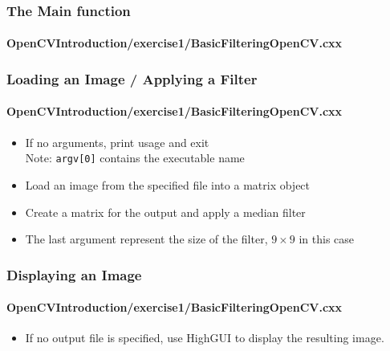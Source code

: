 \begin{frame}
\frametitle{The Main function}
\framesubtitle{OpenCVIntroduction/exercise1/BasicFilteringOpenCV.cxx}
\begin{center}
\begin{itemize}
\end{itemize}
\end{center}
\end{frame}


\begin{frame}
\frametitle{Loading an Image / Applying a Filter}
\framesubtitle{OpenCVIntroduction/exercise1/BasicFilteringOpenCV.cxx}
\begin{center}
\begin{itemize}
\item If no arguments, print usage and exit \\
Note: {\tt argv[0]} contains the executable name
\pause
\item Load an image from the specified file into a matrix object
\pause
\item Create a matrix for the output and apply a median filter
\item The last argument represent the size of the filter, $9\times9$ in this case
\end{itemize}
\end{center}
\end{frame}


\begin{frame}
\frametitle{Displaying an Image}
\framesubtitle{OpenCVIntroduction/exercise1/BasicFilteringOpenCV.cxx}
\begin{center}
\begin{itemize}
\item If no output file is specified, use HighGUI to display the resulting image.
\end{itemize}
\end{center}
\end{frame}


